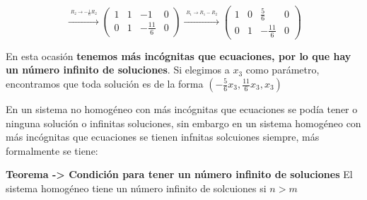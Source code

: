 \documentclass{article}
\begin{document}
\begin{equation}
    \xrightarrow{\overset{\begin{aligned} R_2 \rightarrow -\frac{1}{6}R_2 \end{aligned}}{}} 
    \left(\begin{array}{rrr|r}
        1 & 1 & -1 & 0 \\
        0 & 1 & -\frac{11}{6} & 0 
    \end{array}\right) 
    \xrightarrow{\overset{\begin{aligned} R_1 \rightarrow R_1 - R_2 \end{aligned}}{}} 
    \left(\begin{array}{rrr|r}
        1 & 0 & \frac{5}{6} & 0 \\
        0 & 1 & -\frac{11}{6} & 0
    \end{array}\right)
\end{equation}

En esta ocasión \textbf{tenemos más incógnitas que ecuaciones, por lo que hay un número infinito de soluciones}. Si elegimos a $x_3$ como parámetro, encontramos que toda solución es de la forma $(-\frac{5}{6}x_3,\frac{11}{6}x_3, x_3)$

\begin{tcolorbox}[colback=green!20!white,colframe=green!80!black,title=Ecuaciones con más Incógnitas que Ecuaciones]
    En un sistema no homogéneo con más incógnitas que ecuaciones se podía tener o ninguna solución o infinitas soluciones, sin embargo en un sistema homogéneo con más incógnitas que ecuaciones se tienen infnitas solcuiones siempre, más formalmente se tiene:

    \textbf{Teorema -> Condición para tener un número infinito de soluciones}
    El sistema homogéneo tiene un número infinito de solcuiones si $n > m$ 
\end{tcolorbox}
 
\end{document}
